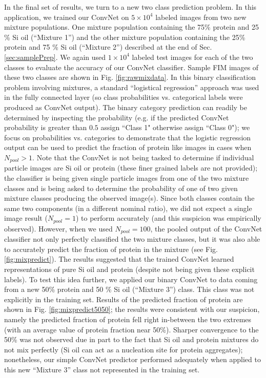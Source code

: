 \documentclass[%
reprint,
superscriptaddress,
 aps,
 pre,
]{revtex4-1}
\begin{document}
In the final set of results, we turn to a new two class prediction problem.  
 In this application, we trained our ConvNet on $5\times 10^4$ labeled images from two  new mixture populations.  One mixture population containing the 75\% protein and 25 \% Si oil (``Mixture 1'') and the other mixture population containing the 25\% protein and 75 \% Si oil (``Mixture 2'') described at the end of Sec. \ref{sec:samplePrep}.  We again used $1\times 10^4$ labeled test images for each of the two classes to evaluate the accuracy of our ConvNet classifier.
 Sample FIM images of these two classes are shown
in Fig. \ref{fig:rawmixdata}.  In this binary classification problem involving mixtures, a  standard ``logistical regression'' approach \cite{Agresti2013} was used in the fully connected layer (so class probabilities vs. categorical labels were produced as ConvNet output).
The binary category prediction can readily be determined by inspecting the probability (e.g. if the predicted ConvNet probability is greater than $0.5$ assign ``Class 1" otherwise assign ``Class 0"); we focus on probabilities vs. categories to demonstrate that the logistic regression output can be used to predict the fraction of protein like images in cases when $N_{pool}>1$.
Note that the ConvNet is  not being tasked to determine if individual particle images are  Si oil or protein (these finer grained labels are not provided); the classifier is being given single particle images from one of the two mixture classes and is being asked to determine the probability of one of two given mixture classes producing the observed image(s).  
%
Since both classes contain the same two components (in a different nominal ratio), we did not expect  a single image result ($N_{pool}=1$) to perform accurately (and this suspicion was empirically observed).  However, when we used $N_{pool}=100$, the pooled output of the ConvNet classifier not only perfectly classified the two mixture classes, but it was also able to accurately predict the fraction of protein in the mixture (see Fig. \ref{fig:mixpredict}).  The results suggested that the trained ConvNet learned representations of pure Si oil and protein (despite not being given these explicit labels).  To test this idea further, we applied our binary ConvNet to data coming from a new 50\%  protein and 50 \% Si oil (``Mixture 3'') class.  This class was not explicitly in the training set.  Results of the predicted fraction of protein are shown in Fig. \ref{fig:mixpredict5050};  the results were consistent with our suspicion, namely the predicted fraction of protein fell right in-between the two extremes (with an average value of protein fraction near 50\%).  Sharper convergence to the 50\% was not observed  due in part to the fact that Si oil and protein mixtures do not mix perfectly (Si oil can act as a nucleation site for protein aggregates);  nonetheless, our simple ConvNet predictor performed adequately when applied to this new  ``Mixture 3'' class not represented in the training set.
\end{document}
